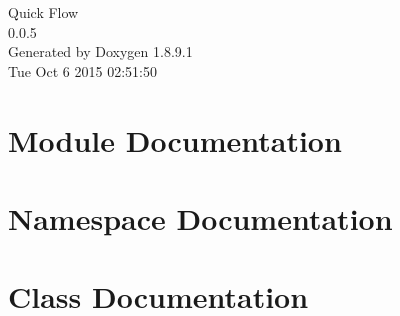 \documentclass[twoside]{article}
\newcommand{\+}{\discretionary{\mbox{\scriptsize$\hookleftarrow$}}{}{}}
\begin{document}
\hypersetup{pageanchor=false,
             bookmarks=true,
             bookmarksnumbered=true,
             pdfencoding=unicode
            }
\begin{titlepage}
\vspace*{7cm}
\begin{center}%
{\Large Quick Flow \\[1ex]\large 0.\+0.\+5 }\\
\vspace*{1cm}
{\large Generated by Doxygen 1.8.9.1}\\
\vspace*{0.5cm}
{\small Tue Oct 6 2015 02:51:50}\\
\end{center}
\end{titlepage}
\tableofcontents
{}
\hypersetup{pageanchor=true}

\section{Module Documentation}



\section{Namespace Documentation}

\section{Class Documentation}
















\end{document}
